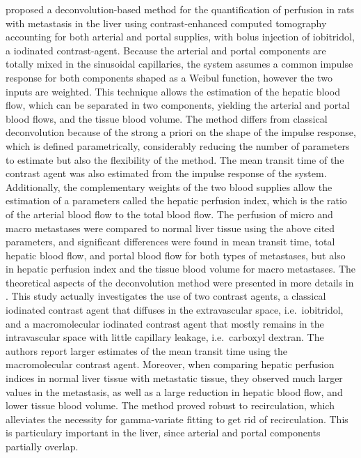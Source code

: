 \citet{Cuenod:2001ef} proposed a deconvolution-based method for the quantification of perfusion in rats with metastasis in the liver using contrast-enhanced computed tomography accounting for both arterial and portal supplies, with bolus injection of iobitridol, a iodinated contrast-agent.
Because the arterial and portal components are totally mixed in the sinusoidal capillaries, the system assumes a common impulse response for both components shaped as a Weibul function, however the two inputs are weighted.
This technique allows the estimation of the hepatic blood flow, which can be separated in two components, yielding the arterial and portal blood flows, and the tissue blood volume.
The method differs from classical deconvolution because of the strong a priori on the shape of the impulse response, which is defined parametrically, considerably reducing the number of parameters to estimate but also the flexibility of the method.
The mean transit time of the contrast agent was also estimated from the impulse response of the system.
Additionally, the complementary weights of the two blood supplies allow the estimation of a parameters called the hepatic perfusion index, which is the ratio of the arterial blood flow to the total blood flow.
The perfusion of micro and macro metastases were compared to normal liver tissue using the above cited parameters, and significant differences were found in mean transit time, total hepatic blood flow, and portal blood flow for both types of metastases, but also in hepatic perfusion index and the tissue blood volume for macro metastases.
The theoretical aspects of the deconvolution method were presented in more details in \cite{Cuenod:2002cm}.
This study actually investigates the use of two contrast agents, a classical iodinated contrast agent that diffuses in the extravascular space, i.e.~iobitridol, and a macromolecular iodinated contrast agent that mostly remains in the intravascular space with little capillary leakage, i.e.~carboxyl dextran.
The authors report larger estimates of the mean transit time using the macromolecular contrast agent.
Moreover, when comparing hepatic perfusion indices in normal liver tissue with metastatic tissue, they observed much larger values in the metastasis, as well as a large reduction in hepatic blood flow, and lower tissue blood volume.
The method proved robust to recirculation, which alleviates the necessity for gamma-variate fitting to get rid of recirculation. 
This is particulary important in the liver, since arterial and portal components partially overlap.

